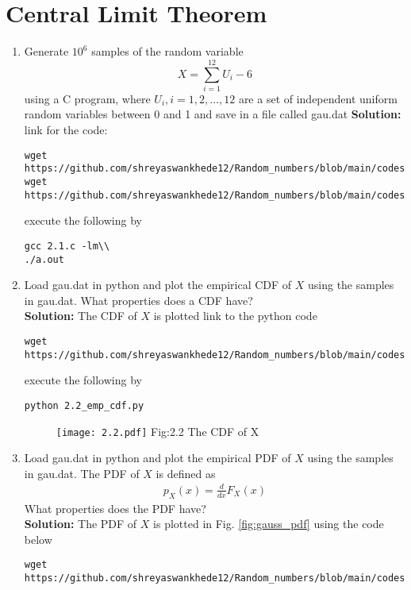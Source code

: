 \documentclass[journal,12pt,twocolumn]{IEEEtran}
\renewcommand\thesection{\arabic{section}}
\theoremstyle{remark}
\newcommand{\solution}{\noindent \textbf{Solution: }}
\numberwithin{equation}{section}
\begin{document}
\section{Central Limit Theorem}
%
\begin{enumerate}[label=\thesection.\arabic*
,ref=\thesection.\theenumi]
%
\item
Generate $10^6$ samples of the random variable
%
\begin{equation}
X = \sum_{i=1}^{12}U_i -6
\end{equation}
%
using a C program, where $U_i, i = 1,2,\dots, 12$ are  a set of independent uniform random variables between 0 and 1
and save in a file called gau.dat
\solution link for the code:
\begin{lstlisting}
wget https://github.com/shreyaswankhede12/Random_numbers/blob/main/codes/2.1.c\\
wget https://github.com/shreyaswankhede12/Random_numbers/blob/main/codes/coeffs.h
\end{lstlisting}
execute the following by
\begin{lstlisting}
gcc 2.1.c -lm\\
./a.out
\end{lstlisting}
\item
Load gau.dat in python and plot the empirical CDF of $X$ using the samples in gau.dat. What properties does a CDF have?
\\
\solution The CDF of $X$ is plotted 
link to the python code
\begin{lstlisting}
wget https://github.com/shreyaswankhede12/Random_numbers/blob/main/codes/2.2_emp_cdf.py
\end{lstlisting}
execute the following by
\begin{lstlisting}
python 2.2_emp_cdf.py
\end{lstlisting}
\begin{figure}
\centering
\texttt{[image: 2.2.pdf]}
Fig:2.2 The CDF of X
\end{figure}
\item
Load gau.dat in python and plot the empirical PDF of $X$ using the samples in gau.dat. The PDF of $X$ is defined as
\begin{align}
p_{X}(x) = \frac{d}{dx}F_{X}(x)
\end{align}
What properties does the PDF have?
\\
\solution The PDF of $X$ is plotted in Fig. \ref{fig:gauss_pdf} using the code below
\begin{lstlisting}
wget https://github.com/shreyaswankhede12/Random_numbers/blob/main/codes/2.3_emp_pdf.py

\end{lstlisting}
\end{enumerate}
\end{document}
